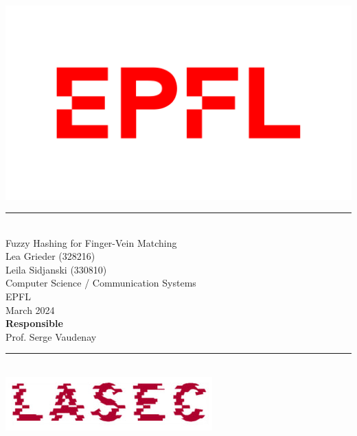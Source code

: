 \documentclass[12pt, a4paper, openany]{article}
\begin{document}
\begin{titlepage}
  \centering
  \includegraphics[width=0.3\linewidth]{latex-img/logo-epfl.png}\\[0.2cm]
  \rule{\textwidth}{0.4pt}\\[2cm]
  {\LARGE Fuzzy Hashing for Finger-Vein Matching}\\[2cm]
  {\normalsize Lea Grieder (328216)\\[0.2cm]Leila Sidjanski (330810)}\\[2cm]
  {\normalsize Computer Science / Communication Systems\\[0.2cm]EPFL}\\[2cm]
  {\normalsize March 2024}\\[2cm]

  {\normalsize\bfseries Responsible}\\[0.2cm]
  {\normalsize Prof. Serge Vaudenay}\\[2cm]
  \rule{\textwidth}{0.3pt}\\[2cm]
  \includegraphics[width=0.3\linewidth]{latex-img/lasec.jpg}\\[0.2cm]
\end{titlepage}


\newpage
\tableofcontents
\thispagestyle{fancy}

\newpage










\newpage

\appendix
\end{document}
